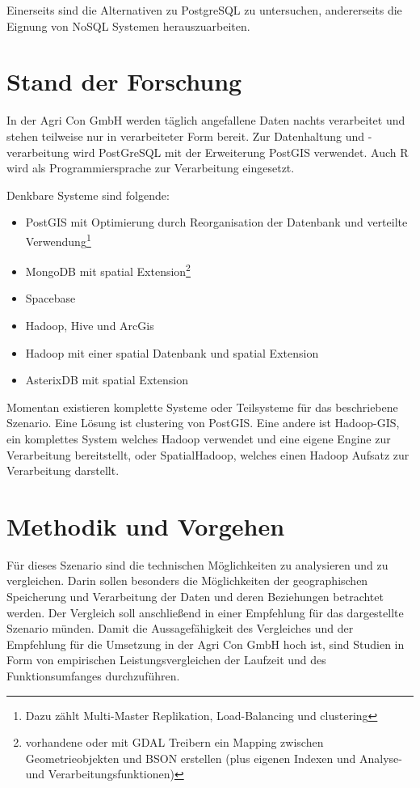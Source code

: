 \documentclass[
a4paper,     %
12pt         %
]{scrartcl}  %
\begin{document}
Einerseits sind die Alternativen zu PostgreSQL zu untersuchen, andererseits die Eignung von NoSQL Systemen herauszuarbeiten.


\section{Stand der Forschung}

In der Agri Con GmbH werden täglich angefallene Daten nachts verarbeitet und stehen teilweise nur in verarbeiteter Form bereit.
Zur Datenhaltung und -verarbeitung wird PostGreSQL mit der Erweiterung PostGIS verwendet. Auch R wird als Programmiersprache zur Verarbeitung eingesetzt.

Denkbare Systeme sind folgende:
\begin{itemize}
\item PostGIS mit Optimierung durch Reorganisation der Datenbank und verteilte Verwendung\footnote{Dazu zählt Multi-Master Replikation, Load-Balancing und clustering}
\item MongoDB mit spatial Extension\footnote{vorhandene oder mit GDAL Treibern ein Mapping zwischen Geometrieobjekten und BSON erstellen (plus eigenen Indexen und Analyse- und Verarbeitungsfunktionen)}
\item Spacebase
\item Hadoop, Hive und ArcGis\cite{website:esri-hadoop1}
\item Hadoop mit einer spatial Datenbank und spatial Extension
\item AsterixDB mit spatial Extension
\end{itemize}


Momentan existieren komplette Systeme oder Teilsysteme für das beschriebene Szenario.
Eine Lösung ist clustering von PostGIS.
Eine andere ist Hadoop-GIS, ein komplettes System welches Hadoop verwendet und eine eigene Engine zur Verarbeitung bereitstellt, oder SpatialHadoop, welches einen Hadoop Aufsatz zur Verarbeitung darstellt.

\section{Methodik und Vorgehen}

Für dieses Szenario sind die technischen Möglichkeiten zu analysieren und zu vergleichen.
Darin sollen besonders die Möglichkeiten der geographischen Speicherung und Verarbeitung der Daten und deren Beziehungen betrachtet werden.
Der Vergleich soll anschließend in einer Empfehlung für das dargestellte Szenario münden.
Damit die Aussagefähigkeit des Vergleiches und der Empfehlung für die Umsetzung in der Agri Con GmbH hoch ist, sind Studien in Form von empirischen Leistungsvergleichen der Laufzeit und des Funktionsumfanges durchzuführen.
\end{document}
